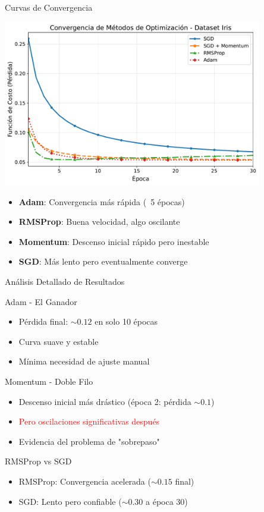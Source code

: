 \documentclass[10pt]{beamer}
\begin{document}
\begin{frame}{Curvas de Convergencia}
\begin{center}
\includegraphics[width=0.85\textwidth]{curvas_convergencia.pdf}
\end{center}

\begin{itemize}
\item \textbf{Adam}: Convergencia más rápida (~5 épocas)
\item \textbf{RMSProp}: Buena velocidad, algo oscilante
\item \textbf{Momentum}: Descenso inicial rápido pero inestable
\item \textbf{SGD}: Más lento pero eventualmente converge
\end{itemize}
\end{frame}

\begin{frame}{Análisis Detallado de Resultados}
\begin{block}{Adam - El Ganador}
\begin{itemize}
\item Pérdida final: $\sim 0.12$ en solo 10 épocas
\item Curva suave y estable
\item Mínima necesidad de ajuste manual
\end{itemize}
\end{block}

\begin{block}{Momentum - Doble Filo}
\begin{itemize}
\item Descenso inicial más drástico (época 2: pérdida $\sim 0.1$)
\item \textcolor{red}{Pero oscilaciones significativas después}
\item Evidencia del problema de "sobrepaso"
\end{itemize}
\end{block}

\begin{block}{RMSProp vs SGD}
\begin{itemize}
\item RMSProp: Convergencia acelerada ($\sim 0.15$ final)
\item SGD: Lento pero confiable ($\sim 0.30$ a época 30)
\end{itemize}
\end{block}
\end{frame}
\end{document}
